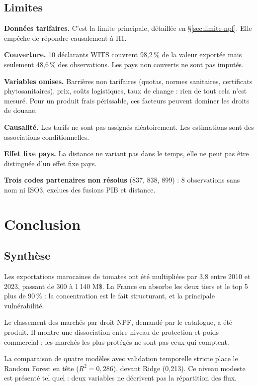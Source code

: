 \documentclass[11pt,a4paper]{article}
\begin{document}
\subsection{Limites}

\textbf{Données tarifaires.} C'est la limite principale, détaillée en
§\ref{sec:limite-npf}. Elle empêche de répondre causalement à H1.

\textbf{Couverture.} 10 déclarants WITS couvrent 98,2\,\% de la valeur exportée mais
seulement 48,6\,\% des observations. Les pays non couverts ne sont pas imputés.

\textbf{Variables omises.} Barrières non tarifaires (quotas, normes sanitaires,
certificats phytosanitaires), prix, coûts logistiques, taux de change : rien de tout
cela n'est mesuré. Pour un produit frais périssable, ces facteurs peuvent dominer les
droits de douane.

\textbf{Causalité.} Les tarifs ne sont pas assignés aléatoirement. Les estimations
sont des associations conditionnelles.

\textbf{Effet fixe pays.} La distance ne variant pas dans le temps, elle ne peut pas
être distinguée d'un effet fixe pays.

\textbf{Trois codes partenaires non résolus} (837, 838, 899) : 8 observations sans nom
ni ISO3, exclues des fusions PIB et distance.

\section{Conclusion}\label{sec:conclusion}

\subsection{Synthèse}

Les exportations marocaines de tomates ont été multipliées par 3,8 entre 2010 et 2023,
passant de 300 à 1\,140 M\$. La France en absorbe les deux tiers et le top 5 plus de
90\,\% : la concentration est le fait structurant, et la principale vulnérabilité.

Le classement des marchés par droit NPF, demandé par le catalogue, a été produit. Il
montre une dissociation entre niveau de protection et poids commercial : les marchés
les plus protégés ne sont pas ceux qui comptent.

La comparaison de quatre modèles avec validation temporelle stricte place le Random
Forest en tête ($R^2 = 0{,}286$), devant Ridge (0,213). Ce niveau modeste est présenté
tel quel : deux variables ne décrivent pas la répartition des flux.
\end{document}
